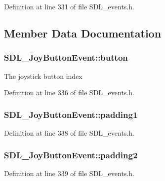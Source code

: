 Definition at line 331 of file S\-D\-L\-\_\-events.\-h.



\subsection{Member Data Documentation}
\hypertarget{struct_s_d_l___joy_button_event_a73ebe4261cf80564052af9c1af737a4d}{
\subsubsection[{button}]{ S\-D\-L\-\_\-\-Joy\-Button\-Event\-::button}}\label{struct_s_d_l___joy_button_event_a73ebe4261cf80564052af9c1af737a4d}
The joystick button index 

Definition at line 336 of file S\-D\-L\-\_\-events.\-h.

\hypertarget{struct_s_d_l___joy_button_event_a3e7ca473fb7783d755d64598529b1ff9}{
\subsubsection[{padding1}]{ S\-D\-L\-\_\-\-Joy\-Button\-Event\-::padding1}}\label{struct_s_d_l___joy_button_event_a3e7ca473fb7783d755d64598529b1ff9}


Definition at line 338 of file S\-D\-L\-\_\-events.\-h.

\hypertarget{struct_s_d_l___joy_button_event_a77a78bee38f4bf0682ccd97bbf8f9ab9}{
\subsubsection[{padding2}]{ S\-D\-L\-\_\-\-Joy\-Button\-Event\-::padding2}}\label{struct_s_d_l___joy_button_event_a77a78bee38f4bf0682ccd97bbf8f9ab9}


Definition at line 339 of file S\-D\-L\-\_\-events.\-h.

